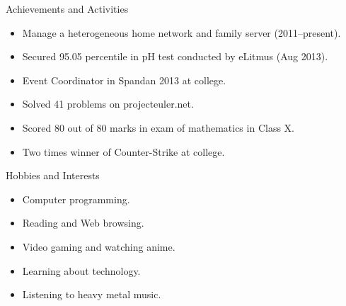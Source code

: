\documentclass[11pt,oneside]{article}
\newenvironment{ressection}[1]{
  \vspace{4pt}
	     {\fontfamily{phv}\selectfont\Large#1}
	     \begin{itemize}
	       \vspace{3pt}
}{
	     \end{itemize}
}
\newcommand{\resitem}[1]{
  \vspace{-4pt}
\item \begin{flushleft} #1 \end{flushleft}
}
\begin{document}
\begin{ressection}{Achievements and Activities}
  \resitem{Manage a heterogeneous home network and family server (2011--present).}
  \resitem{Secured 95.05 percentile in pH test conducted by eLitmus (Aug 2013).}
  \resitem{Event Coordinator in Spandan 2013 at college.}
  \resitem{Solved 41 problems on projecteuler.net.}
  \resitem{Scored 80 out of 80 marks in exam of mathematics in Class X.}
  \resitem{Two times winner of Counter-Strike at college.}
\end{ressection}

\begin{ressection}{Hobbies and Interests}
  \resitem{Computer programming.}
  \resitem{Reading and Web browsing.}
  \resitem{Video gaming and watching anime.}
  \resitem{Learning about technology.}
  \resitem{Listening to heavy metal music.}
\end{ressection}
\end{document}
